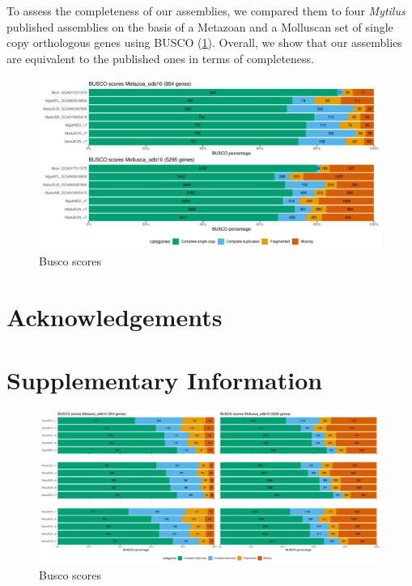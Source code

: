 \documentclass[11pt, a4paper]{article}
\begin{document}
\begin{landscape}
	
\end{landscape}


To assess the completeness of our assemblies, we compared them to four \textit{Mytilus} published assemblies on the basis of a Metazoan and a Molluscan set of single copy orthologous genes using BUSCO (\cref{fig:busco}).
Overall, we show that our assemblies are equivalent to the published ones in terms of completeness.

\begin{figure}[h]
	\includegraphics[width=\linewidth]{figures/Fig2_busco.pdf}
	\caption{Busco scores}
	\label{fig:busco}
\end{figure}





\section*{Acknowledgements}


\printbibliography


\newpage
\appendix
\setcounter{table}{0}
\renewcommand{\thetable}{S\arabic{table}}
\setcounter{figure}{0}
\renewcommand{\thefigure}{S\arabic{figure}}
\section*{Supplementary Information}

\begin{figure}[h]
	\includegraphics[width=\linewidth]{figures/supfig_busco.pdf}
	\caption{Busco scores}
	\label{supfig:busco}
\end{figure}
\end{document}
